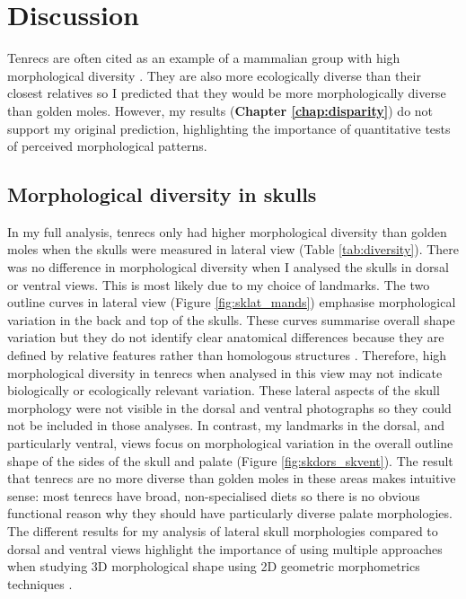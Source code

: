 \chapter{Discussion}
\label{chap:discussion}

\noindent

Tenrecs are often cited as an example of a mammalian group with high morphological diversity \citep{Olson2013, Soarimalala2011, Eisenberg1969}. They are also more ecologically diverse than their closest relatives \citep{Soarimalala2011, Bronner1995} so I predicted that they would be more morphologically diverse than golden moles. However, my results (\textbf{Chapter \ref{chap:disparity}}) do not support my original prediction, highlighting the importance of quantitative tests of perceived morphological patterns.

\section{Morphological diversity in skulls}


	In my full analysis, tenrecs only had higher morphological diversity than golden moles when the skulls were measured in lateral view (Table \ref{tab:diversity}). There was no difference in morphological diversity when I analysed the skulls in dorsal or ventral views. This is most likely due to my choice of landmarks. The two outline curves in lateral view (Figure \ref{fig:sklat_mands}) emphasise morphological variation in the back and top of the skulls. These curves summarise overall shape variation but they do not identify clear anatomical differences because they are defined by relative features rather than homologous structures \citep{Zelditch2012}. Therefore, high morphological diversity in tenrecs when analysed in this view may not indicate biologically or ecologically relevant variation.	
	These lateral aspects of the skull morphology were not visible in the dorsal and ventral photographs so they could not be included in those analyses. In contrast, my landmarks in the dorsal, and particularly ventral, views focus on morphological variation in the overall outline shape of the sides of the skull and palate (Figure \ref{fig:skdors_skvent}). The result that tenrecs are no more diverse than golden moles in these areas makes intuitive sense: most tenrecs have broad, non-specialised diets \citep{Olson2013} so there is no obvious functional reason why they should have particularly diverse palate morphologies.
	The different results for my analysis of lateral skull morphologies compared to dorsal and ventral views highlight the importance of using multiple approaches when studying 3D morphological shape using 2D geometric morphometrics techniques \citep{Arnqvist1998}.

